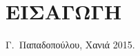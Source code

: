 \chapter*{ΕΙΣΑΓΩΓΗ}





\bigskip

\begin{flushright}
\begin{minipage}{150pt}
Γ.\ Παπαδοπούλου, Χανιά 2015.
\end{minipage}
\end{flushright}



\endinput
